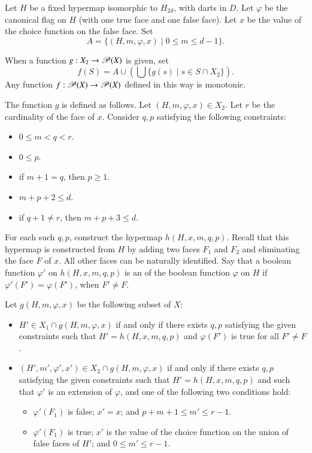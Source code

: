 Let $H$ be a fixed hypermap isomorphic to $H_{2d}$, with darts in $D$.
Let $\varphi$ be the canonical flag on $H$ (with one true face and one
false face).  Let $x$ be the value of the choice function on the false
face.  Set
\begin{displaymath}A = \{(H,m,\varphi,x) \mid 0\le m \le d-1
\}.\end{displaymath}

When a function 
$g:X_2 \to {\mathscr P}(X)$ is given, set 
\begin{displaymath}f(S) = A \cup (\bigcup \{g(s) \mid s\in S\cap
X_2\}).\end{displaymath} Any function $f :{\mathscr P}(X)\to
{\mathscr P}(X)$ defined in this way is monotonic.  %

The function $g$ is defined as follows.  Let $(H,m,\varphi,x)\in X_2$.
Let $r$ be the cardinality of the face of $x$.  Consider $q,p$
satisfying the following constraints:
\begin{itemize}
\item $0\le m < q < r$.
\item $0\le p$.
\item if $m+1 = q$, then $p \ge 1$.
\item $m+p+2 \le d$.
\item if $q+1\ne r$, then $m+p+3\le d$.
\end{itemize}

For each such $q,p$, construct the hypermap $h(H,x,m,q,p)$.  Recall
that this hypermap is constructed from $H$ by adding two faces $F_1$
and $F_2$ and eliminating the face $F$ of $x$.  All other faces can be
naturally identified.  Say that a boolean function $\varphi'$ on
$h(H,x,m,q,p)$ is an  of the boolean function
$\varphi$ on $H$ if $\varphi'(F') =\varphi(F')$, when $F'\ne F$.
%

Let $g(H,m,\varphi,x)$ be the following subset of $X$:
\begin{itemize}
\item $H'\in X_1\cap g(H,m,\varphi,x)$ if and only if there exists
$q,p$ satisfying the given constraints such that $H'=h(H,x,m,q,p)$
and $\varphi(F')$ is true for all $F'\ne F$.
\item $(H',m',\varphi',x')\in X_2\cap g(H,m,\varphi,x)$ if and only if
there exists $q,p$ satisfying the given constraints such that
$H'=h(H,x,m,q,p)$ and such that $\varphi'$ is an extension of
$\varphi$, and one of the following two conditions hold:
\begin{itemize}
\item $\varphi'(F_1)$ is false;  $x' = x$; and  $p+m+1 \le m' \le r-1$.
\item $\varphi'(F_1)$ is true; $x'$ is the value of the choice
function on the union of false faces of $H'$; and $0 \le m' \le
r-1$.
\end{itemize}
\end{itemize}





